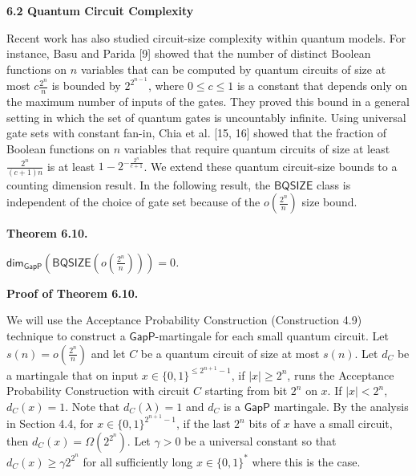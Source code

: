 \documentclass[10pt,a4paper]{article}
\begin{document}
\par\medskip\noindent\textbf{
6.2 Quantum Circuit Complexity}\par




Recent work has also studied circuit-size complexity within quantum models. For instance, Basu and Parida [9] showed that the number of distinct Boolean functions on $n$ variables that can be computed by quantum circuits of size at most $c\frac{2^{n}}{n}$ is bounded by $2^{2^{n-1}}$, where $0\leq c\leq 1$ is a constant that depends only on the maximum number of inputs of the gates. They proved this bound in a general setting in which the set of quantum gates is uncountably infinite.
Using universal gate sets with constant fan-in, Chia et al. [15, 16] showed that the fraction of Boolean functions on $n$ variables that require quantum circuits of size at least $\frac{2^{n}}{(c+1)n}$ is at least $1-2^{-\frac{2^{n}}{c+1}}$.
We extend these quantum circuit-size bounds to a counting dimension result. In the following result, the $\mathsf{BQSIZE}$ class is independent of the choice of gate set because of the $o\left(\frac{2^{n}}{n}\right)$ size bound.\par





\par\medskip\noindent\textbf{
\textbf{Theorem 6.10}\textbf{.}
}\par



${\mathsf{dim}}_{\mathsf{GapP}}\left(\mathsf{BQSIZE}\left(o\left(\frac{2^{n}}{n}\right)\right)\right)=0$\emph{.}\par






\par\medskip\noindent\textbf{Proof of Theorem 6.10.}\par




We will use the Acceptance Probability Construction (Construction 4.9) technique to construct a $\mathsf{GapP}$-martingale for each small quantum circuit.
Let $s(n)=o(\frac{2^{n}}{n})$ and let $C$ be a quantum circuit of size at most $s(n)$.
Let $d_{C}$ be a martingale that on input $x\in\{0,1\}^{\leq 2^{n+1}-1}$, if $|x|\geq 2^{n}$,
runs the Acceptance Probability Construction with circuit $C$ starting from bit $2^{n}$ on $x$. If $|x|<2^{n}$, $d_{C}(x)=1$.
Note that $d_{C}(\lambda)=1$ and $d_{C}$ is a $\mathsf{GapP}$ martingale. By the analysis in Section 4.4, for $x\in\{0,1\}^{2^{n+1}-1}$, if the last $2^{n}$ bits of $x$ have a small circuit, then $d_{C}(x)=\Omega(2^{2^{n}})$.
Let $\gamma>0$ be a universal constant so that $d_{C}(x)\geq\gamma 2^{2^{n}}$ for all sufficiently long $x\in\{0,1\}^{*}$ where this is the case.\par
\end{document}
